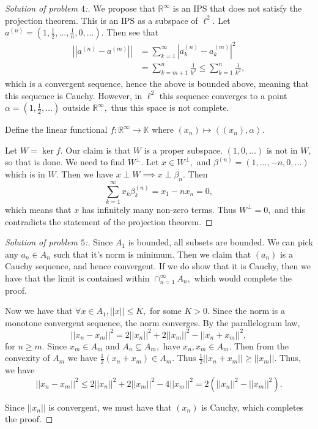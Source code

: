 \documentclass[letterpaper,11pt,twoside]{article}
\theoremstyle{proposition}
\theoremstyle{definition}
\theoremstyle{theorem}
\theoremstyle{definition}
\theoremstyle{definition}
\theoremstyle{definition}
\theoremstyle{lemma}
\theoremstyle{definition}
\theoremstyle{definition}
\theoremstyle{corollary}
\theoremstyle{definition}
\theoremstyle{definition}
\theoremstyle{definition}
\newcommand{\R}{\mathbb{R}}
\newcommand{\abs}[1]{\left \vert #1 \right \vert}
\newcommand{\norm}[1]{\left \vert \left \vert #1 \right \vert \right \vert}
\newcommand{\gen}[1]{\left\langle #1\right\rangle}
\begin{document}
\begin{proof}[Solution of problem $4$:]
	We propose that $\R^{\infty}$ is an IPS that does not satisfy the projection theorem. 
	This is an IPS as a subspace of $\ell^2.$ Let $a^{(n)}=\left(1, \frac{1}{2}, \dots, \frac{1}{n}, 0, \dots\right).$ Then see that 
	\begin{align*}
		\norm{a^{(n)}-a^{(m)}} &= \sum_{k=1}^{\infty} \abs{a^{(n)}_k-a^{(m)}_k}^2\\
		&= \sum_{k=m+1}^{n} \frac{1}{k^2} \leq \sum_{k=1}^{n} \frac{1}{k^2},
	\end{align*}
which is a convergent sequence, hence the above is bounded above, meaning that this sequence is Cauchy. However, in $\ell^2$ this sequence converges to a 
point $\alpha = \left(1, \frac{1}{2}, \dots\right)$ outside $\R^{\infty},$ thus this space is not complete. 

Define the linear functional $f: \R^{\infty} \to \mathbb{K}$ where $(x_n) \mapsto \gen{(x_n),\alpha}.$

Let $W=\ker f.$ Our claim is that $W$ is a proper subspace. $(1,0,\dots)$ is not in $W,$ so that is done. We need to find $W^{\perp}.$ Let $x \in 
W^{\perp},$ and $\beta^{(n)}= \left(1,\dots, -n,0,\dots\right)$ which is in $W.$ Then we have $x \perp W \implies x \perp \beta_n.$
Then $$\sum_{k=1}^{\infty}x_k\beta^{(n)}_k= x_1-nx_n=0, $$ which means that $x$ has infinitely many non-zero terms. Thus $W^{\perp}= 0,$ and this 
contradicts the statement of the projection theorem. 
\end{proof}
\begin{proof}[Solution of problem $5$:]
	Since $A_1$ is bounded, all subsets are bounded. We can pick any $a_n \in A_n$ such that it's norm is minimum. Then we claim that $(a_n)$ is a Cauchy 
	sequence, and hence convergent. If we do show that it is Cauchy, then we have that the limit is contained within $\cap_{n=1}^{\infty} A_n,$ which would 
	complete the proof.
	
	Now we have that $\forall x \in A_1, ||x|| \leq K,$ for some $K>0.$ Since the norm is a monotone convergent sequence, the norm converges. By the 
	parallelogram law, $$ \norm{x_n-x_m}^2 = 2 \norm{x_n}^2 + 2\norm{x_m}^2 - \norm{x_n+x_m}^2,$$
	for $n \geq m.$ Since $x_m \in A_m$ and $A_n \subseteq A_m,$ have $x_n,x_m \in A_m.$ 
	Then from the convexity of $A_m$ we have $\frac{1}{2}(x_n+x_m) \in A_m.$ Thus $\frac{1}{2}\norm{x_n+x_m} \geq \norm{x_m}.$
Thus, we have $$\norm{x_n-x_m}^2 \leq 2\norm{x_n}^2 + 2\norm{x_m}^2 - 4\norm{x_m}^2 = 2 (\norm{x_n}^2-\norm{x_m}^2). $$

Since $\norm{x_n}$ is convergent, we must have that $(x_n)$ is Cauchy, which completes the proof. 	 
\end{proof}
\end{document}
